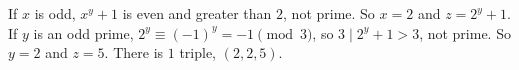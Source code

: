 If $x$ is odd, $x^y+1$ is even and greater than $2$, not prime. So $x=2$ and $z=2^y+1$. If $y$ is an odd prime, $2^y\equiv(-1)^y=-1\pmod3$, so $3\mid2^y+1>3$, not prime. So $y=2$ and $z=5$. There is $\boxed{1}$ triple, $(2,2,5)$.
